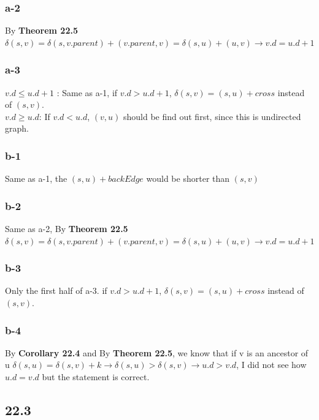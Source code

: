 \documentclass[]{article}
\begin{document}
\subsubsection{a-2}

By \textbf{Theorem 22.5} $\delta(s,v) = \delta(s,v.parent) + (v.parent, v) = \delta(s,u) + (u,v) \rightarrow v.d = u.d + 1$

\subsubsection{a-3}

$v.d \le u.d + 1$ : Same as a-1, if $v.d > u.d + 1$, $\delta(s,v) = (s,u) + cross$ instead of $(s,v)$. \\
$v.d \ge u.d$: If $v.d < u.d$, $(v,u)$ should be find out first, since this is undirected graph. 

\subsubsection{b-1}

Same as a-1, the $(s, u) + backEdge$ would be shorter than $(s, v)$

\subsubsection{b-2}

Same as a-2, By \textbf{Theorem 22.5} $\delta(s,v) = \delta(s,v.parent) + (v.parent, v) = \delta(s,u) + (u,v) \rightarrow v.d = u.d + 1$

\subsubsection{b-3}

Only the first half of a-3. if $v.d > u.d + 1$, $\delta(s,v) = (s,u) + cross$ instead of $(s,v)$. 
\subsubsection{b-4}

By \textbf{Corollary 22.4} and By \textbf{Theorem 22.5}, we know that if v is an ancestor of u $\delta (s, u) = \delta(s, v) + k \rightarrow \delta(s, u) > \delta (s, v) \rightarrow u.d > v.d$, I did not see how $u.d = v.d$ but the statement is correct.

\subsection{22.3}
\end{document}
